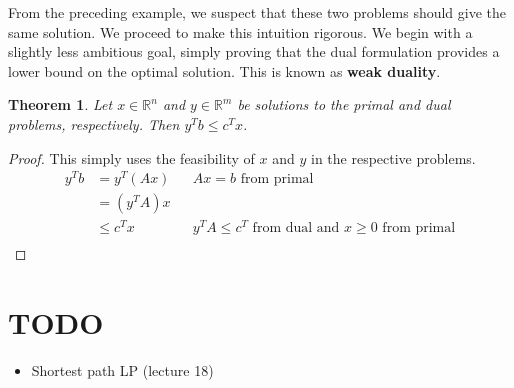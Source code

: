 \documentclass[12pt]{article}
\newcommand{\R}{\mathcal{R}}
\def\R{\mathbb{R}}
\newtheorem{thm}{Theorem}
\begin{document}
From the preceding example, we suspect that these two problems should give the same solution. We proceed to make this intuition rigorous. We begin with a slightly less
ambitious goal, simply proving that the dual formulation provides a lower bound on the optimal solution. This is known as \textbf{weak duality}. 

\begin{thm}
Let $x \in \R^n$ and $y \in \R^m$ be solutions to the primal and dual problems, respectively. Then $y^T b \leq c^T x$. 
\end{thm}

\begin{proof}
This simply uses the feasibility of $x$ and $y$ in the respective problems. 
\begin{align*}
y^T b &= y^T(Ax) && Ax = b \text{ from primal} \\
	 &= (y^T A)x \\
	 &\leq c^T x && y^T A \leq c^T \text{ from dual and } x \geq 0 \text{ from primal} \\
\end{align*}
\end{proof}




	
\section{TODO}
\begin{itemize}
\item Shortest path LP (lecture 18)
\end{itemize}
	
	
\end{document}
